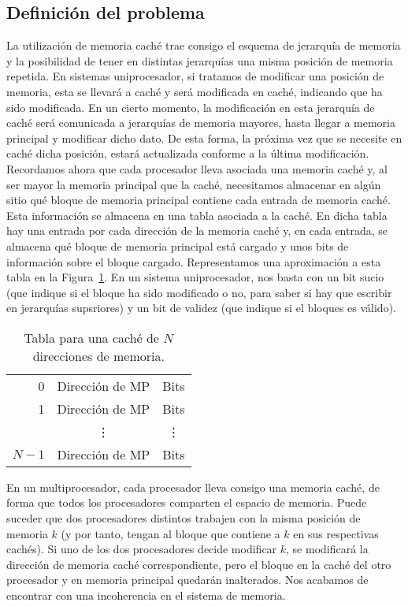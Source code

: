 \subsection{Definición del problema}
La utilización de memoria caché trae consigo el esquema de jerarquía de memoria y la posibilidad de tener en distintas jerarquías una misma posición de memoria repetida. En sistemas uniprocesador, si tratamos de modificar una posición de memoria, esta se llevará a caché y será modificada en caché, indicando que ha sido modificada. En un cierto momento, la modificación en esta jerarquía de caché será comunicada a jerarquías de memoria mayores, hasta llegar a memoria principal y modificar dicho dato. De esta forma, la próxima vez que se necesite en caché dicha posición, estará actualizada conforme a la última modificación.\\

Recordamos ahora que cada procesador lleva asociada una memoria caché y, al ser mayor la memoria principal que la caché, necesitamos almacenar en algún sitio qué bloque de memoria principal contiene cada entrada de memoria caché. Esta información se almacena en una tabla asociada a la caché. En dicha tabla hay una entrada por cada dirección de la memoria caché y, en cada entrada, se almacena qué bloque de memoria principal está cargado y unos bits de información sobre el bloque cargado. Representamos una aproximación a esta tabla en la Figura~\ref{tab:tabla_cache}. En un sistema uniprocesador, nos basta con un bit sucio (que indique si el bloque ha sido modificado o no, para saber si hay que escribir en jerarquías supsriores) y un bit de validez (que indique si el bloques es válido).\\

\begin{table}
\centering
\begin{tabular}{r|c|c|}
    \cline{2-3}
    0 & Dirección de MP & Bits \\ \cline{2-3}
    1 & Dirección de MP & Bits \\ \cline{2-3}
      & \vdots & \vdots \\ \cline{2-3}
    $N-1$ & Dirección de MP & Bits \\ \cline{2-3}
\end{tabular}
\caption{Tabla para una caché de $N$ direcciones de memoria.}
\label{tab:tabla_cache}
\end{table}

En un multiprocesador, cada procesador lleva consigo una memoria caché, de forma que todos los procesadores comparten el espacio de memoria. Puede suceder que dos procesadores distintos trabajen con la misma posición de memoria $k$ (y por tanto, tengan al bloque que contiene a $k$ en sus respectivas cachés). Si uno de los dos procesadores decide modificar $k$, se modificará la dirección de memoria caché correspondiente, pero el bloque en la caché del otro procesador y en memoria principal quedarán inalterados. Nos acabamos de encontrar con una incoherencia en el sistema de memoria.\\

